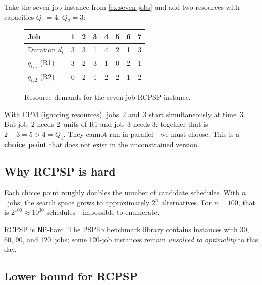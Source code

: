 \begin{example}
\label{ex:rcpsp-seven}
Take the seven-job instance from \cref{ex:seven-jobs} and add
two resources with capacities $Q_1 = 4$, $Q_2 = 3$:

\begin{figure}[H]
\centering
\begin{tabular}{lccccccc}
\toprule
\textbf{Job}      & 1 & 2 & 3 & 4 & 5 & 6 & 7 \\
\midrule
Duration $d_i$     & 3 & 3 & 1 & 4 & 2 & 1 & 3 \\
$q_{i,1}$ (R1)     & 3 & 2 & 3 & 1 & 0 & 2 & 1 \\
$q_{i,2}$ (R2)     & 0 & 2 & 1 & 2 & 2 & 1 & 2 \\
\bottomrule
\end{tabular}
\caption{Resource demands for the seven-job RCPSP instance.}
\label{fig:rcpsp-data}
\end{figure}

\noindent
With CPM (ignoring resources), jobs~2 and~3 start simultaneously
at time~3.  But job~2 needs 2~units of R1 and job~3 needs 3:
together that is $2 + 3 = 5 > 4 = Q_1$.  They cannot run in
parallel---we must choose.  This is a \textbf{choice point} that
does not exist in the unconstrained version.
\end{example}

\subsection{Why RCPSP is hard}
\label{ssec:rcpsp-hard}

Each choice point roughly doubles the number of candidate
schedules.  With $n$~jobs, the search space grows to approximately
$2^n$ alternatives.%
For $n = 100$, that is $2^{100} \approx 10^{30}$
schedules---impossible to enumerate.

RCPSP is $\mathsf{NP}$-hard.  The PSPlib benchmark library contains
instances with 30, 60, 90, and 120~jobs;
some 120-job instances remain \emph{unsolved to optimality}
to this day.

\subsection{Lower bound for RCPSP}
\label{ssec:rcpsp-lower-bound}

